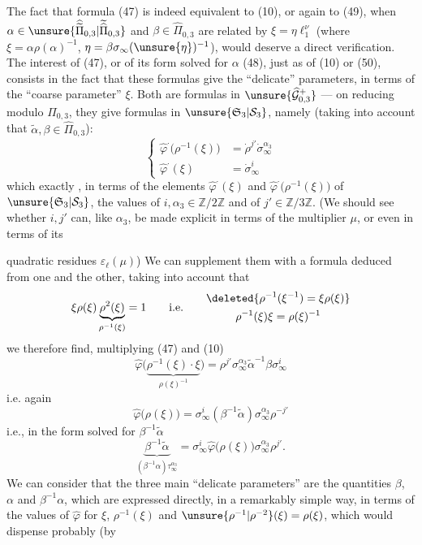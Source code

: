 The fact that formula (47) is indeed equivalent to (10), or again to (49), when $\alpha\in\unsure{\widehat{\widetilde\Pi}_{0,3}|\widetilde{\widehat\Pi}_{0,3}}$ and $\beta\in\widehat\Pi_{0,3}$ are related by $\xi=\eta\ell_1^\nu$ (where $\xi=\alpha\rho(\alpha)^{-1}$, $\eta=\beta\sigma_\infty(\unsure{\eta})^{-1}$), would deserve a direct verification. The interest of (47), or of  its form solved for $\alpha$ (48), just as of (10) or (50), consists in the fact that these formulas give the ``delicate'' parameters\inserted{$\alpha,\beta$}, in terms of the ``coarse parameter'' $\xi$. Both are formulas in $\unsure{\widehat{\mathcal G}_{0,3}^{+}}$ --- on reducing modulo $\widehat\Pi_{0,3}$, they give formulas in $\unsure{\mathfrak S_3|\mathcal S_3}$, namely (taking into account that $\widetilde\alpha,\beta\in\widehat\Pi_{0,3}$):
\[
\left\{
\begin{aligned}
\widehat{\varphi}^{\cdot}\bigl(\rho^{-1}(\xi)\bigr)&=\dot\rho^{j'}\dot\sigma_\infty^{\alpha_3}\\
\widehat{\varphi}^{\cdot}(\xi)&=\dot\sigma_\infty^i
\end{aligned}
\right.
\tag{51}
\]
which  exactly , in terms of the elements $\widehat{\varphi}^{\cdot}(\xi)$ and $\widehat{\varphi}^{\cdot}\bigl(\rho^{-1}(\xi)\bigr)$ of $\unsure{\mathfrak S_3|\mathcal S_3}$, the values of $i,\alpha_3\in\mathbb Z/2\mathbb Z$ and of $j'\in\mathbb Z/3\mathbb Z$. (We should see whether $i,j'$ can, like $\alpha_3$, be made explicit in terms of the multiplier $\mu$, or even in terms of its


quadratic residues $\varepsilon_\ell(\mu)$) We can supplement them with a formula deduced from one and  the other, taking into account that
\[
\xi\rho(\xi)\underbrace{\rho^2(\xi)}_{\rho^{-1}(\xi)}=1
\qquad\text{i.e.}\qquad
\begin{gathered}
\deleted{\rho^{-1}(\xi^{-1})=\xi\rho(\xi)}\\
\rho^{-1}(\xi)\xi=\rho(\xi)^{-1}
\end{gathered}
\]
we therefore find, multiplying (47) and (10)
\[
\widehat{\varphi}\bigl(\underbrace{\rho^{-1}(\xi)\cdot\xi}_{\rho(\xi)^{-1}}\bigr)
=\rho^{j'}\sigma_\infty^{\alpha_3}\widetilde\alpha^{-1}\beta\sigma_\infty^i
\]
i.e. again
\[
\widehat{\varphi}\bigl(\rho(\xi)\bigr)
=\sigma_\infty^i(\beta^{-1}\widetilde\alpha)\sigma_\infty^{\alpha_3}\rho^{-j'}
\tag{52}
\]
i.e., in the form solved for $\beta^{-1}\widetilde\alpha$
\[
\underbrace{\beta^{-1}\widetilde\alpha}_{(\beta^{-1}\alpha)\tau_\infty^{\alpha_3}}
=\sigma_\infty^i\widehat{\varphi}\bigl(\rho(\xi)\bigr)\sigma_\infty^{\alpha_3}\rho^{j'}.
\tag{53}
\]
We can consider that the three main ``delicate parameters'' are the quantities $\beta$, $\alpha$ and $\beta^{-1}\alpha$, which are expressed directly, in a remarkably simple way, in terms of the values of $\widehat{\varphi}$ for $\xi$, $\rho^{-1}(\xi)$ and $\unsure{\rho^{-1}|\rho^{-2}}(\xi)=\rho(\xi)$, which would dispense  probably (by

